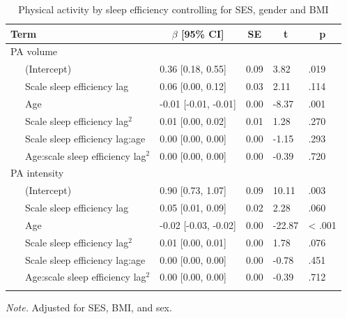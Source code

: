 \documentclass[
  man]{apa6}
\begin{document}
\begin{table}[tbp]

\begin{center}
\begin{threeparttable}

\caption{\label{tab:PA-by-sleep-efficiency}Physical activity by sleep efficiency controlling for SES, gender and BMI}

\begin{tabular}{lllll}
\toprule
Term & \multicolumn{1}{c}{$\beta$ [95\% CI]} & \multicolumn{1}{c}{SE} & \multicolumn{1}{c}{t} & \multicolumn{1}{c}{p}\\
\midrule
PA volume &  &  &  & \\
\ \ \ (Intercept) & 0.36 [0.18, 0.55] & 0.09 & 3.82 & .019\\
\ \ \ Scale sleep efficiency lag & 0.06 [0.00, 0.12] & 0.03 & 2.11 & .114\\
\ \ \ Age & -0.01 [-0.01, -0.01] & 0.00 & -8.37 & .001\\
\ \ \ Scale sleep efficiency lag$^2$ & 0.01 [0.00, 0.02] & 0.01 & 1.28 & .270\\
\ \ \ Scale sleep efficiency lag:age & 0.00 [0.00, 0.00] & 0.00 & -1.15 & .293\\
\ \ \ Age:scale sleep efficiency lag$^2$ & 0.00 [0.00, 0.00] & 0.00 & -0.39 & .720\\
PA intensity &  &  &  & \\
\ \ \ (Intercept) & 0.90 [0.73, 1.07] & 0.09 & 10.11 & .003\\
\ \ \ Scale sleep efficiency lag & 0.05 [0.01, 0.09] & 0.02 & 2.28 & .060\\
\ \ \ Age & -0.02 [-0.03, -0.02] & 0.00 & -22.87 & < .001\\
\ \ \ Scale sleep efficiency lag$^2$ & 0.01 [0.00, 0.01] & 0.00 & 1.78 & .076\\
\ \ \ Scale sleep efficiency lag:age & 0.00 [0.00, 0.00] & 0.00 & -0.78 & .451\\
\ \ \ Age:scale sleep efficiency lag$^2$ & 0.00 [0.00, 0.00] & 0.00 & -0.39 & .712\\
\bottomrule
\addlinespace
\end{tabular}

\begin{tablenotes}[para]
\normalsize{\textit{Note.} Adjusted for SES, BMI, and sex. }
\end{tablenotes}

\end{threeparttable}
\end{center}

\end{table}
\end{document}
